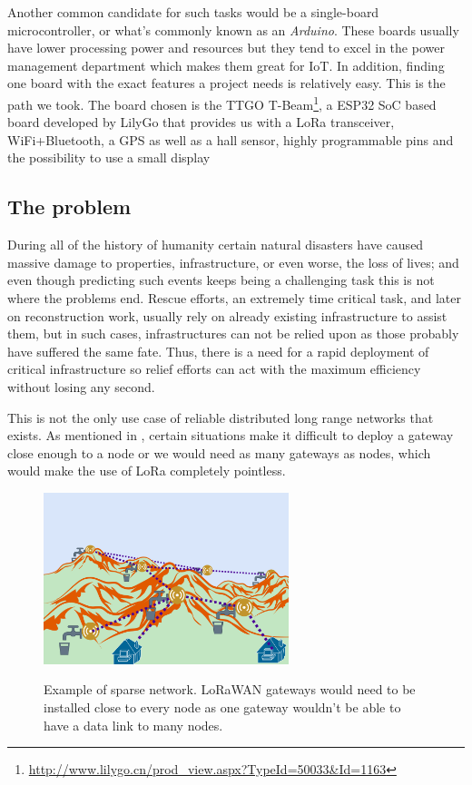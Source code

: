 Another common candidate for such tasks would be a single-board microcontroller, or what's commonly known as an \textit{Arduino}. These boards usually have lower processing power and resources but they tend to excel in the power management department which makes them great for IoT. In addition, finding one board with the exact features a project needs is relatively easy. This is the path we took. The board chosen is the TTGO T-Beam\footnote{\url{http://www.lilygo.cn/prod_view.aspx?TypeId=50033&Id=1163}}, a ESP32 SoC based board developed by LilyGo that provides us with a LoRa transceiver, WiFi+Bluetooth, a GPS as well as a hall sensor, highly programmable pins and the possibility to use a small display

\subsection{The problem}
During all of the history of humanity certain natural disasters have caused massive damage to properties, infrastructure, or even worse, the loss of lives; and even though predicting such events keeps being a challenging task this is not where the problems end. Rescue efforts, an extremely time critical task, and later on reconstruction work, usually rely on already existing infrastructure to assist them, but in such cases, infrastructures can not be relied upon as those probably have suffered the same fate. Thus, there is a need for a rapid deployment of critical infrastructure so relief efforts can act with the maximum efficiency without losing any second.\cite{LoRaMoto}

This is not the only use case of reliable distributed long range networks that exists. As mentioned in \cite{StarOfStars}, certain situations make it difficult to deploy a gateway close enough to a node or we would need as many gateways as nodes, which would make the use of LoRa completely pointless.


\begin{figure}[h]
        \centering
        \includegraphics[height=5cm]{Figures/MountainMesh.png}
        \caption{Example of sparse network. LoRaWAN gateways would need to be installed close to every node as one gateway wouldn't be able to have a data link to many nodes.}
        \cite{StarOfStars}
        \label{fig:MountainMesh}
\end{figure}


